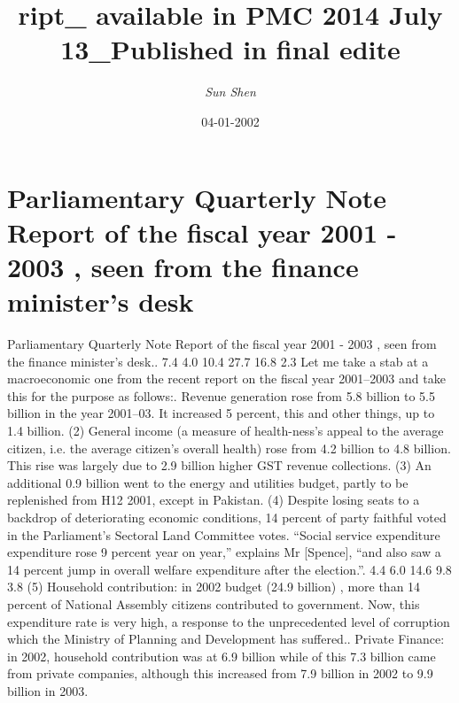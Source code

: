 \documentclass{article}%
\title{ript\_ available in PMC 2014 July 13\_Published in final edite}%
\author{\textit{Sun Shen}}%
\date{04-01-2002}%
\begin{document}
%
\normalsize%
\maketitle%
\section{Parliamentary Quarterly Note Report of the fiscal year 2001 {-} 2003 , seen from the finance minister’s desk}%
\label{sec:ParliamentaryQuarterlyNoteReportofthefiscalyear2001{-}2003,seenfromthefinanceministersdesk}%
Parliamentary Quarterly Note Report of the fiscal year 2001 {-} 2003 , seen from the finance minister’s desk.. 7.4 4.0 10.4 27.7 16.8 2.3\newline%
Let me take a stab at a macroeconomic one from the recent report on the fiscal year 2001–2003 and take this for the purpose as follows:. Revenue generation rose from 5.8 billion to 5.5 billion in the year 2001–03. It increased 5 percent, this and other things, up to 1.4 billion.\newline%
(2) General income (a measure of health{-}ness’s appeal to the average citizen, i.e. the average citizen’s overall health) rose from 4.2 billion to 4.8 billion. This rise was largely due to 2.9 billion higher GST revenue collections.\newline%
(3) An additional 0.9 billion went to the energy and utilities budget, partly to be replenished from H12 2001, except in Pakistan.\newline%
(4) Despite losing seats to a backdrop of deteriorating economic conditions, 14 percent of party faithful voted in the Parliament’s Sectoral Land Committee votes.\newline%
“Social service expenditure expenditure rose 9 percent year on year,” explains Mr {[}Spence{]}, “and also saw a 14 percent jump in overall welfare expenditure after the election.”. 4.4 6.0 14.6 9.8 3.8\newline%
(5) Household contribution: in 2002 budget (24.9 billion) , more than 14 percent of National Assembly citizens contributed to government. Now, this expenditure rate is very high, a response to the unprecedented level of corruption which the Ministry of Planning and Development has suffered.. Private Finance: in 2002, household contribution was at 6.9 billion while of this 7.3 billion came from private companies, although this increased from 7.9 billion in 2002 to 9.9 billion in 2003.\newline%
\end{document}
